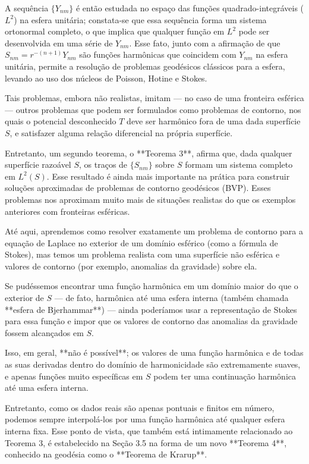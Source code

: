 A sequência $\{Y_{nm}\}$ é então estudada no espaço das funções quadrado-integráveis ($L^2$) na esfera unitária; constata-se que essa sequência forma um sistema ortonormal completo, o que implica que qualquer função em $L^2$ pode ser desenvolvida em uma série de $Y_{nm}$. Esse fato, junto com a afirmação de que $S_{nm} = r^{-(n+1)} Y_{nm}$ são funções harmônicas que coincidem com $Y_{nm}$ na esfera unitária, permite a resolução de problemas geodésicos clássicos para a esfera, levando ao uso dos núcleos de Poisson, Hotine e Stokes.

Tais problemas, embora não realistas, imitam — no caso de uma fronteira esférica — outros problemas que podem ser formulados como problemas de contorno, nos quais o potencial desconhecido $T$ deve ser harmônico fora de uma dada superfície $S$, e satisfazer alguma relação diferencial na própria superfície.

Entretanto, um segundo teorema, o **Teorema 3**, afirma que, dada qualquer superfície razoável $S$, os traços de $\{S_{nm}\}$ sobre $S$ formam um sistema completo em $L^2(S)$. Esse resultado é ainda mais importante na prática para construir soluções aproximadas de problemas de contorno geodésicos (BVP). Esses problemas nos aproximam muito mais de situações realistas do que os exemplos anteriores com fronteiras esféricas.

Até aqui, aprendemos como resolver exatamente um problema de contorno para a equação de Laplace no exterior de um domínio esférico (como a fórmula de Stokes), mas temos um problema realista com uma superfície não esférica e valores de contorno (por exemplo, anomalias da gravidade) sobre ela.

Se pudéssemos encontrar uma função harmônica em um domínio maior do que o exterior de $S$ — de fato, harmônica até uma esfera interna (também chamada **esfera de Bjerhammar**) — ainda poderíamos usar a representação de Stokes para essa função e impor que os valores de contorno das anomalias da gravidade fossem alcançados em $S$.

Isso, em geral, **não é possível**; os valores de uma função harmônica e de todas as suas derivadas dentro do domínio de harmonicidade são extremamente suaves, e apenas funções muito específicas em $S$ podem ter uma continuação harmônica até uma esfera interna.

Entretanto, como os dados reais são apenas pontuais e finitos em número, podemos sempre interpolá-los por uma função harmônica até qualquer esfera interna fixa. Esse ponto de vista, que também está intimamente relacionado ao Teorema 3, é estabelecido na Seção 3.5 na forma de um novo **Teorema 4**, conhecido na geodésia como o **Teorema de Krarup**.

